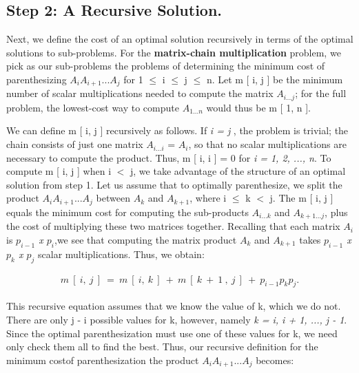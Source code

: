 \subsection{Step 2: A Recursive Solution.}

Next, we define the cost of an optimal solution recursively in terms of the optimal solutions to sub-problems. For the {\bfseries matrix-chain multiplication} problem, we pick as our sub-problems the problems of determining the minimum cost of parenthesizing $A_{i} A_{i+1} ... A_{j}$ for 1 $\leq$ i $\leq$ j $\leq$ n. Let m [ i, j ] be the minimum number of scalar multiplications needed to compute the matrix $A_{i...j}$; for the full problem, the lowest-cost way to compute $A_{1...n}$ would thus be m [ 1, n ]. \hfill \break

We can define m [ i, j ]  recursively as follows. If {\itshape i = j} , the problem is trivial; the chain consists of just one matrix $A_{i...i}$ = $A_{i}$, so that no scalar multiplications are necessary to compute the product. Thus, m [ i, i ] = 0 for {\itshape i = 1, 2, ..., n}. To compute m [ i,  j ] when i $<$ j, we take advantage of the structure of an optimal solution from step 1. Let us assume that to optimally parenthesize, we split the product $A_{i} A_{i+1} ... A_{j}$ between $A_{k}$ and $A_{k+1}$, where i $\leq$ k $<$ j. The m [ i, j ] equals the minimum cost for computing the sub-products $A_{i...k}$ and $A_{k+1...j}$, plus the cost of multiplying these two matrices together. Recalling that each matrix $A_{i}$ is {\itshape $p_{i-1}$ x $p_{i}$},we see that computing the matrix product $A_{k}$ and $A_{k+1}$ takes {\itshape $p_{i-1}$ x $p_{k}$ x $p_{j}$} scalar multiplications. Thus, we obtain: \hfill \break

\begin{ceqn}
\begin{align*}
m\ [\ i,\ j\ ]\ =\ m\ [\ i,\ k\ ]\ +\ m\ [\ k\ +\ 1\ ,\ j\ ]\ +\ p_{i-1} p_{k} p_{j}.
\end{align*}
\end{ceqn} \hfill \break

This recursive equation assumes that we know the value of k, which we do not. There are only j - i possible values for k, however, namely {\itshape k = i, i + 1, ..., j - 1}. Since the optimal parenthesization must use one of these values for k, we need only check them all to find the best. Thus, our recursive definition for the minimum costof parenthesization the product $A_{i} A_{i+1} ... A_{j}$ becomes: \hfill \break

